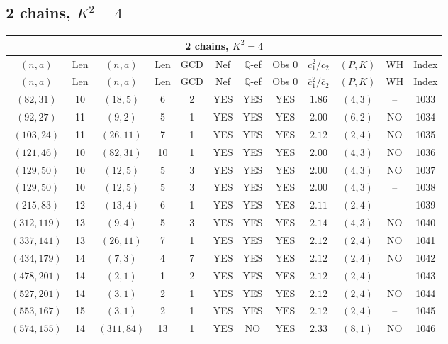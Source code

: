 \subsection{2 chains, $K^2 = 4$}
\begin{longtable}{|c|c|c|c|c|c|c|c|c|c|c|c|}
\hline
\multicolumn{12}{|c|}{2 chains, $K^2 = 4$}\\
\hline
$(n,a)$ & Len & $(n,a)$ & Len & GCD & Nef & $\mathbb Q$-ef & Obs 0 & $\overline c_1^2 / \overline c_2$ & $(P,K)$ & WH & Index\\
\hline
\endfirsthead

\hline
$(n,a)$ & Len & $(n,a)$ & Len & GCD & Nef & $\mathbb Q$-ef & Obs 0 & $\overline c_1^2 / \overline c_2$ & $(P,K)$ & WH & Index\\
\hline
\endhead
\hline
\endfoot

$(82,31)$ & 10 & $(18,5)$ & 6 & 2 & YES & YES & YES & $1.86$ & $(4,3)$ & -- & 1033\\
$(92,27)$ & 11 & $(9,2)$ & 5 & 1 & YES & YES & YES & $2.00$ & $(6,2)$ & NO & 1034\\
$(103,24)$ & 11 & $(26,11)$ & 7 & 1 & YES & YES & YES & $2.12$ & $(2,4)$ & NO & 1035\\
$(121,46)$ & 10 & $(82,31)$ & 10 & 1 & YES & YES & YES & $2.00$ & $(4,3)$ & NO & 1036\\
$(129,50)$ & 10 & $(12,5)$ & 5 & 3 & YES & YES & YES & $2.00$ & $(4,3)$ & NO & 1037\\
$(129,50)$ & 10 & $(12,5)$ & 5 & 3 & YES & YES & YES & $2.00$ & $(4,3)$ & -- & 1038\\
$(215,83)$ & 12 & $(13,4)$ & 6 & 1 & YES & YES & YES & $2.11$ & $(2,4)$ & -- & 1039\\
$(312,119)$ & 13 & $(9,4)$ & 5 & 3 & YES & YES & YES & $2.14$ & $(4,3)$ & NO & 1040\\
$(337,141)$ & 13 & $(26,11)$ & 7 & 1 & YES & YES & YES & $2.12$ & $(2,4)$ & NO & 1041\\
$(434,179)$ & 14 & $(7,3)$ & 4 & 7 & YES & YES & YES & $2.12$ & $(2,4)$ & NO & 1042\\
$(478,201)$ & 14 & $(2,1)$ & 1 & 2 & YES & YES & YES & $2.12$ & $(2,4)$ & -- & 1043\\
$(527,201)$ & 14 & $(3,1)$ & 2 & 1 & YES & YES & YES & $2.12$ & $(2,4)$ & NO & 1044\\
$(553,167)$ & 15 & $(3,1)$ & 2 & 1 & YES & YES & YES & $2.12$ & $(2,4)$ & -- & 1045\\
$(574,155)$ & 14 & $(311,84)$ & 13 & 1 & YES & NO & YES & $2.33$ & $(8,1)$ & NO & 1046\\

\end{longtable}

